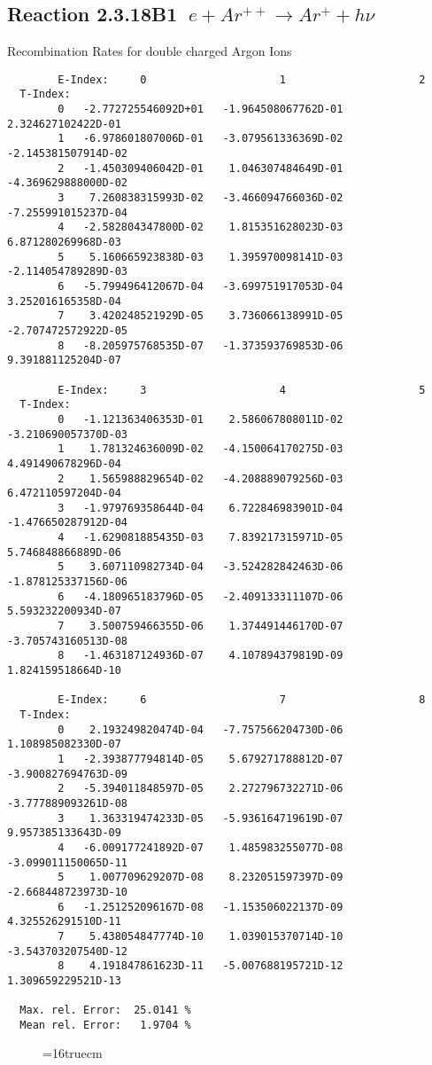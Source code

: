 \documentclass[12pt]{article}
\begin{document}
\subsection{
Reaction 2.3.18B1   $\  e + Ar^{++} \rightarrow  Ar^+ + h\nu$
}

  Recombination Rates for double
  charged Argon Ions

\begin{small}\begin{verbatim}
        E-Index:     0                     1                     2
  T-Index:
        0   -2.772725546092D+01   -1.964508067762D-01    2.324627102422D-01
        1   -6.978601807006D-01   -3.079561336369D-02   -2.145381507914D-02
        2   -1.450309406042D-01    1.046307484649D-01   -4.369629888000D-02
        3    7.260838315993D-02   -3.466094766036D-02   -7.255991015237D-04
        4   -2.582804347800D-02    1.815351628023D-03    6.871280269968D-03
        5    5.160665923838D-03    1.395970098141D-03   -2.114054789289D-03
        6   -5.799496412067D-04   -3.699751917053D-04    3.252016165358D-04
        7    3.420248521929D-05    3.736066138991D-05   -2.707472572922D-05
        8   -8.205975768535D-07   -1.373593769853D-06    9.391881125204D-07

        E-Index:     3                     4                     5
  T-Index:
        0   -1.121363406353D-01    2.586067808011D-02   -3.210690057370D-03
        1    1.781324636009D-02   -4.150064170275D-03    4.491490678296D-04
        2    1.565988829654D-02   -4.208889079256D-03    6.472110597204D-04
        3   -1.979769358644D-04    6.722846983901D-04   -1.476650287912D-04
        4   -1.629081885435D-03    7.839217315971D-05    5.746848866889D-06
        5    3.607110982734D-04   -3.524282842463D-06   -1.878125337156D-06
        6   -4.180965183796D-05   -2.409133311107D-06    5.593232200934D-07
        7    3.500759466355D-06    1.374491446170D-07   -3.705743160513D-08
        8   -1.463187124936D-07    4.107894379819D-09    1.824159518664D-10

        E-Index:     6                     7                     8
  T-Index:
        0    2.193249820474D-04   -7.757566204730D-06    1.108985082330D-07
        1   -2.393877794814D-05    5.679271788812D-07   -3.900827694763D-09
        2   -5.394011848597D-05    2.272796732271D-06   -3.777889093261D-08
        3    1.363319474233D-05   -5.936164719619D-07    9.957385133643D-09
        4   -6.009177241892D-07    1.485983255077D-08   -3.099011150065D-11
        5    1.007709629207D-08    8.232051597397D-09   -2.668448723973D-10
        6   -1.251252096167D-08   -1.153506022137D-09    4.325526291510D-11
        7    5.438054847774D-10    1.039015370714D-10   -3.543703207540D-12
        8    4.191847861623D-11   -5.007688195721D-12    1.309659229521D-13

  Max. rel. Error:  25.0141 %
  Mean rel. Error:   1.9704 %

\end{verbatim}\end{small}
\begin{figure} \label{2.3.18B1}
\epsfxsize=16truecm
\end{figure}
\newpage
\end{document}

